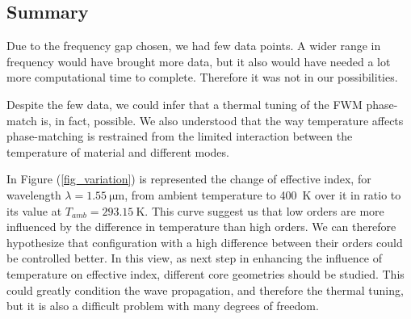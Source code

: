 \documentclass[12pt,a4paper,twoside]{article}
\begin{document}
\subsection{Summary}
Due to the frequency gap chosen, we had few data points.
A wider range in frequency would have brought more data, but it also would have needed a lot more computational time to complete.
Therefore it was not in our possibilities.

Despite the few data, we could infer that a thermal tuning of the FWM phase-match is, in fact, possible.
We also understood that the way temperature affects phase-matching is restrained from the limited interaction between the temperature of material and different modes.

In Figure (\ref{fig_variation}) is represented the change of effective index, for wavelength $\lambda = \SI{1.55}{\um}$, from ambient temperature to \SI{400}{\K} over it in ratio to its value at $T_{amb}=\SI{293.15}{\K}$.
This curve suggest us that low orders are more influenced by the difference in temperature than high orders.
We can therefore hypothesize that configuration with a high difference between their orders could be controlled better.
In this view, as next step in enhancing the influence of temperature on effective index, different core geometries should be studied.
This could greatly condition the wave propagation, and therefore the thermal tuning, but it is also a difficult problem with many degrees of freedom.
\end{document}
